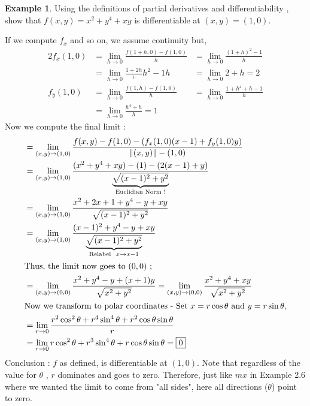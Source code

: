 \documentclass[
	12pt,
	]{article}
\DeclarePairedDelimiter{\norm}{\lVert}{\rVert}
\theoremstyle{custom}
\theoremstyle{custom}
\theoremstyle{custom}
\theoremstyle{custom}
\theoremstyle{custom}
\theoremstyle{definition}
\newtheorem{example}{Example}[section]
\theoremstyle{example}
\theoremstyle{note}
\theoremstyle{remark}
\theoremstyle{example}
\newcounter{theo}[section]\setcounter{theo}{0}
\numberwithin{equation}{subsection}
\begin{document}
 	\begin{example}
 		Using the definitions of partial derivatives and differentiability , show that $f(x,y) = x^{2}+y^{4}+xy$ is differentiable at $(x,y) = (1,0)$. 
 		
 		\noindent If we compute $f_{x}$ and so on, we assume continuity but, 
 		\begin{alignat*}{2} 
 			f_{x}(1,0) &= \lim_{h \to 0} \frac{f(1+h, 0)-f(1,0)}{h} &= \lim_{h\to 0} \frac{(1+h)^{2}-1}{h} \\
 			&= \lim_{h \to 0} \frac{1+2h}+h^{2}-1{h} &= \lim_{h\to 0} 2+h = 2 \\
 			f_{y}(1,0) &= \lim_{h\to 0} \frac{f(1,h) -f(1,0)}{h} &= \lim_{h \to 0}\frac{1+h^{4}+h-1}{h} \\
 			& =\lim_{h \to 0} \frac{h^{4}+h}{h} = 1
 		\end{alignat*}
 		Now we compute the final limit : 
 		\begin{align*}
 			&= \lim_{(x,y) \to (1,0)} \frac{f(x,y)-f(1,0)-(f_{x}(1,0)(x-1)+f_{y}(1,0)y)}{\norm{(x,y)}-(1,0)} \\
 			&= \lim_{(x,y) \to (1,0)} \frac{(x^{2}+y^{4}+xy) -(1)-(2(x-1)+y)}{\underbrace{\sqrt{(x-1)^{2}+y^{2}}}_{\text{Euclidian Norm !}}}\\
 			&= \lim_{(x,y) \to (1,0)} \frac{x^{2}+2x +1 +y^{4}-y+xy}{\sqrt{(x-1)^{2}+y^{2}}}\\
 			&= \lim_{(x,y) \to (1,0)} \frac{(x-1)^{2}+y^{4} -y +xy}{\underbrace{\sqrt{(x-1)^{2}+y^{2}}}_{\text{Relabel } \ x\to x-1}} \\
 			\intertext{Thus, the limit now goes to $(0,0)$ ; } 
 			&= \lim_{(x,y) \to (0,0)} \frac{x^{2}+y^{4}-y+(x+1)y}{\sqrt{x^{2}+y^{2}}} = \lim_{(x,y) \to (0,0)} \frac{x^{2}+y^{4}+xy}{\sqrt{x^{2}+y^{2}}}\\
 			\intertext{Now we transform to polar coordinates - Set $x= r\cos \theta $ and $y = r\sin \theta$,} 
 			&= \lim_{r\to 0} \frac{r^{2}\cos^{2}\theta + r^{4}\sin^{4}\theta + r^{2}\cos \theta \sin \theta}{r} \\
 			&= \lim_{r\to 0} r\cos^{2}\theta +r^{3}\sin^{4}\theta +r\cos\theta\sin\theta = \boxed{0}
 	 	\end{align*}
 	 	Conclusion : $f$ as defined, is differentiable at $(1,0)$. Note that regardless of the value for $\theta$ , $r$ dominates and goes to zero. Therefore, just like $mx$ in Example 2.6 where we wanted the limit to come from "all sides", here all directions ($\theta$) point to zero.
 	\end{example}
 	
\end{document}
